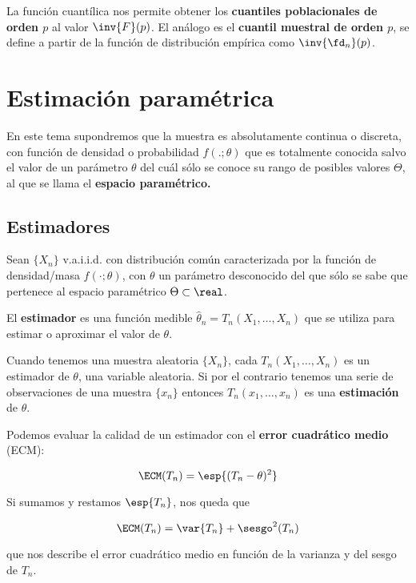 \documentclass{apuntes}
\begin{document}
La función cuantílica nos permite obtener los \textbf{cuantiles poblacionales de orden $p$}  al valor $\inv{F}(p)$. El análogo es el \textbf{cuantil muestral de orden $p$},  se define a partir de la función de distribución empírica como $\inv{\fd_n}(p)$.

\chapter{Estimación paramétrica}

En este tema supondremos que la muestra es absolutamente continua o discreta, con función de densidad o probabilidad $f(.;\theta)$ que es totalmente conocida salvo el valor de un parámetro $\theta$ del cuál sólo se conoce su rango de posibles valores $\Theta$, al que se llama el \textbf{espacio paramétrico.}

\section{Estimadores}

\begin{defn}[Estimador] Sean $\{X_n\}$ v.a.i.i.d. con distribución común caracterizada por la función de densidad/masa $f(\cdot;\theta)$, con $\theta$ un parámetro desconocido del que sólo se sabe que pertenece al espacio paramétrico $\Theta \subset \real$.

El \textbf{estimador} es una función medible $\hat{\theta}_n = T_n(X_1,\dotsc, X_n)$ que se utiliza para estimar o aproximar el valor de $\theta$.
\end{defn}

Cuando tenemos una muestra aleatoria $\{X_n\}$, cada $T_n(X_1, \dotsc, X_n)$ es un estimador de $\theta$, una variable aleatoria. Si por el contrario tenemos una serie de observaciones de una muestra $\{x_n\}$ entonces $T_n(x_1,\dotsc,x_n)$ es una \textbf{estimación} de $\theta$.

Podemos evaluar la calidad de un estimador con el \textbf{error cuadrático medio} (ECM):

\[ \ECM (T_n) = \esp{(T_n - \theta)^2}\]

Si sumamos y restamos $\esp{T_n}$, nos queda que

\[ \ECM (T_n) = \var{T_n} + \sesgo^2(T_n) \]

que nos describe el error cuadrático medio en función de la varianza y del sesgo de $T_n$.
\end{document}
